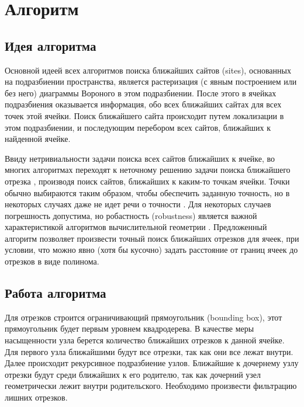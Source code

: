 \FloatBarrier
\section{Алгоритм}
\subsection{Идея алгоритма}
Основной идеей всех алгоритмов поиска ближайших сайтов (sites),
основанных на подразбиении пространства, является растеризация (с явным
построением или без него) диаграммы Вороного в этом подразбиении. После
этого в ячейках подразбиения оказывается информация, обо всех ближайших
сайтах для всех точек этой ячейки. Поиск ближайшего сайта происходит
путем локализации в этом подразбиении, и последующим перебором всех
сайтов, ближайших к найденной ячейке.

Ввиду нетривиальности задачи поиска всех сайтов ближайших к ячейке,
во многих алгоритмах переходят к неточному решению задачи поиска
ближайшего отрезка \cite{NGRID}, производя поиск сайтов, ближайших к каким-то
точкам ячейки. Точки обычно выбираются таким образом, чтобы обеспечить
заданную точность, но в некоторых случаях даже не идет речи о точности \cite{AVOR}.
Для некоторых случаев погрешность допустима, но робастность (robustness)
является важной характеристикой алгоритмов вычислительной геометрии \cite{ROBUS}.
Предложенный алгоритм позволяет произвести точный поиск ближайших
отрезков для ячеек, при условии, что можно явно (хотя бы кусочно) задать
расстояние от границ ячеек до отрезков в виде полинома.

\FloatBarrier
\subsection{Работа алгоритма}

Для отрезков строится ограничивающий прямоугольник (bounding box), этот прямоугольник будет первым
уровнем квадродерева. В качестве меры насыщенности узла берется количество
ближайших отрезков к данной ячейке. Для первого узла ближайшими будут все
отрезки, так как они все лежат внутри. Далее происходит рекурсивное
подразбиение узлов. Ближайшие к дочернему узлу отрезки будут среди ближайших
к его родителю, так как дочерний узел геометрически лежит внутри
родительского. Необходимо произвести фильтрацию лишних отрезков.

